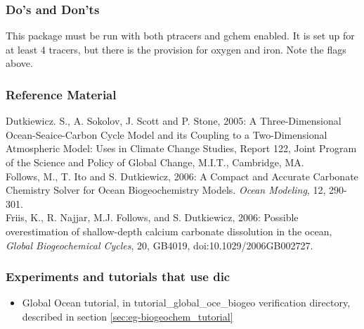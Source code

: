 \subsubsection{Do's and Don'ts}

This package must be run with both ptracers and gchem enabled.
It is set up for at least 4 tracers, but there is the provision for
oxygen and iron. Note the flags above.

\subsubsection{Reference Material}

Dutkiewicz. S., A. Sokolov, J. Scott and P. Stone, 2005:
A Three-Dimensional Ocean-Seaice-Carbon Cycle Model and its Coupling
to a Two-Dimensional Atmospheric Model: Uses in Climate Change Studies,
Report 122, Joint Program of the Science and Policy of Global Change,
M.I.T., Cambridge, MA.
\\

Follows, M., T. Ito and S. Dutkiewicz, 2006:
A Compact and Accurate Carbonate Chemistry Solver for Ocean
Biogeochemistry Models. {\it Ocean Modeling}, 12, 290-301.
\\

Friis, K.,  R. Najjar, M.J. Follows, and S. Dutkiewicz, 2006:
Possible overestimation of shallow-depth calcium carbonate
dissolution in the ocean,
{\it Global Biogeochemical Cycles}, 20, GB4019, doi:10.1029/2006GB002727.
\\


\subsubsection{Experiments and tutorials that use dic}
\label{sec:pkg:dic:experiments}

\begin{itemize}
\item{Global Ocean tutorial, in tutorial\_global\_oce\_biogeo verification directory, 
described in section \ref{sec:eg-biogeochem_tutorial} }
\end{itemize}

